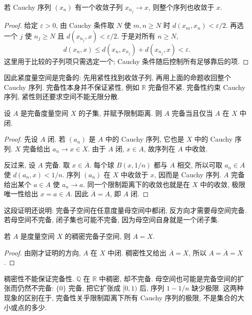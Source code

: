 \begin{proposition}\label{prop:complete-subsequence}
若 Cauchy 序列 $(x_n)$ 有一个收敛子列 $x_{n_j}\to x$, 则整个序列也收敛于 $x$.
\end{proposition}
\begin{proof}
给定 $\varepsilon>0$, 由 Cauchy 条件取 $N$ 使 $m,n\geq N$ 时 $d(x_m,x_n)<\varepsilon/2$. 再选一个 $j$ 使 $n_j\geq N$ 且 $d(x_{n_j},x)<\varepsilon/2$. 于是对所有 $n\geq N$,
\[
d(x_n,x)\leq d(x_n,x_{n_j})+d(x_{n_j},x)<\varepsilon.
\]
这里用于比较的子列项只需选定一个; Cauchy 条件随后控制所有足够靠后的项.
\end{proof}

因此紧度量空间是完备的: 先用紧性找到收敛子列, 再用上面的命题收回整个 Cauchy 序列. 完备性本身并不保证紧性, 例如 $\mathbb R$ 完备但不紧. 完备性约束 Cauchy 序列, 紧性则还要求空间不能无限分散.


\begin{theorem}\label{thm:closed-complete}
设 $A$ 是完备度量空间 $X$ 的子集, 并赋予限制距离. 则 $A$ 完备当且仅当 $A$ 在 $X$ 中闭.
\end{theorem}
\begin{proof}
先设 $A$ 闭. 若 $(a_n)$ 是 $A$ 中的 Cauchy 序列, 它也是 $X$ 中的 Cauchy 序列. $X$ 完备给出 $a_n\to x\in X$. 由于 $A$ 闭, $x\in A$, 故序列在 $A$ 中收敛.

反过来, 设 $A$ 完备. 取 $x\in\overline A$. 每个球 $B(x,1/n)$ 都与 $A$ 相交, 所以可取 $a_n\in A$ 使 $d(a_n,x)<1/n$. 序列 $(a_n)$ 在 $X$ 中收敛于 $x$, 因而是 Cauchy 序列. $A$ 完备给出某个 $a\in A$ 使 $a_n\to a$. 同一个限制距离下的收敛也就是在 $X$ 中的收敛, 极限唯一性给出 $x=a\in A$. 因此 $\overline A=A$, 即 $A$ 闭.
\end{proof}

这段证明还说明: 完备子空间在任意度量母空间中都闭, 反方向才需要母空间完备. 若母空间不完备, 闭子集也可能不完备, 因为母空间自身就是一个闭子集.

\begin{corollary}\label{cor:dense-complete}
若 $A$ 是度量空间 $X$ 的稠密完备子空间, 则 $A=X$.
\end{corollary}
\begin{proof}
由刚才证明的方向, $A$ 在 $X$ 中闭. 稠密性又给出 $\overline A=X$, 所以 $A=\overline A=X$.
\end{proof}

\begin{remark}
稠密性不能保证完备性. $\mathbb Q$ 在 $\mathbb R$ 中稠密, 却不完备. 母空间也可能是完备空间的扩张而仍然不完备: $\{0\}$ 完备, 把它扩张成 $[0,1)$ 后, 序列 $1-1/n$ 缺少极限. 这两种现象的区别在于, 完备性关乎限制距离下所有 Cauchy 序列的极限, 不是集合的大小或点的多少.
\end{remark}

